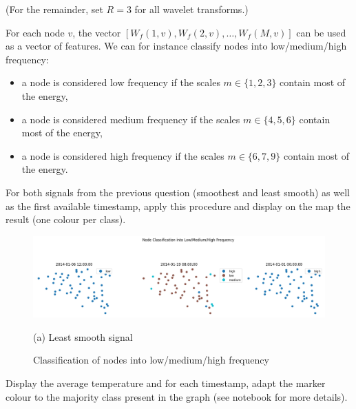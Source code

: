 \documentclass[11pt]{article}
\begin{document}
\newpage
\begin{exercise}
(For the remainder, set $R=3$ for all wavelet transforms.)

For each node $v$, the vector $[W_f(1, v), W_f(2, v),\dots, W_f(M, v)]$ can be used as a vector of features. We can for instance classify nodes into low/medium/high frequency: 
\begin{itemize}
    \item a node is considered low frequency if the scales $m\in\{1,2,3\}$ contain most of the energy,
    \item a node is considered medium frequency if the scales $m\in\{4,5,6\}$ contain most of the energy,
    \item a node is considered high frequency if the scales $m\in\{6,7,9\}$ contain most of the energy.
\end{itemize}


For both signals from the previous question (smoothest and least smooth) as well as the first available timestamp, apply this procedure and display on the map the result (one colour per class).

\end{exercise}

\begin{solution}
\begin{figure}
    \centering
    \begin{minipage}[t]{1\textwidth}
    \centerline{\includegraphics[width=\textwidth]{output2.png}}
    \centerline{(a) Least smooth signal}
    \end{minipage}
    \caption{Classification of nodes into low/medium/high frequency}\label{fig:node-classif}
\end{figure}
\end{solution}

\newpage
\begin{exercise}
Display the average temperature and for each timestamp, adapt the marker colour to the majority class present in the graph (see notebook for more details).
\end{exercise}
\end{document}
